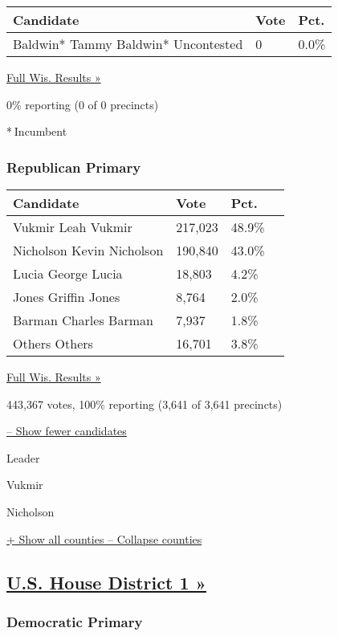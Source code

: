 \begin{longtable}[]{@{}lll@{}}
\toprule
Candidate & Vote & Pct.\tabularnewline
\midrule
\endhead
 Baldwin* Tammy Baldwin* Uncontested & 0 & 0.0\%\tabularnewline
\bottomrule
\end{longtable}

\href{https://www.nytimes3xbfgragh.onion/elections/results/wisconsin}{Full
Wis. Results »}

0\% reporting (0 of 0 precincts)

* Incumbent

\hypertarget{republican-primary-1}{%
\subsubsection{Republican Primary}\label{republican-primary-1}}

\begin{longtable}[]{@{}llll@{}}
\toprule
Candidate & Vote & Pct. &\tabularnewline
\midrule
\endhead
 Vukmir Leah Vukmir & 217,023 & 48.9\% &\tabularnewline
 Nicholson Kevin Nicholson & 190,840 & 43.0\% &\tabularnewline
 Lucia George Lucia & 18,803 & 4.2\% &\tabularnewline
 Jones Griffin Jones & 8,764 & 2.0\% &\tabularnewline
 Barman Charles Barman & 7,937 & 1.8\% &\tabularnewline
 Others Others & 16,701 & 3.8\% &\tabularnewline
\bottomrule
\end{longtable}

\href{https://www.nytimes3xbfgragh.onion/elections/results/wisconsin}{Full
Wis. Results »}

443,367 votes, 100\% reporting (3,641 of 3,641 precincts)

\protect\hyperlink{}{-- Show fewer candidates}

Leader

 Vukmir

 Nicholson

\protect\hyperlink{}{+ Show all counties -- Collapse counties}

\hypertarget{us-house-district-1-}{%
\subsection{\texorpdfstring{\href{https://www.nytimes3xbfgragh.onion/elections/results/wisconsin-house-district-1-primary-election}{U.S.
House District 1
»}}{U.S. House District 1 »}}\label{us-house-district-1-}}

\hypertarget{democratic-primary-2}{%
\subsubsection{Democratic Primary}\label{democratic-primary-2}}

